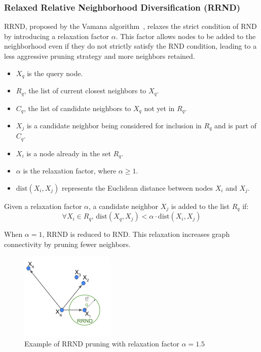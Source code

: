 \subsubsection{Relaxed Relative Neighborhood Diversification (RRND)}
RRND, proposed by the Vamana algorithm~\cite{vamana}, relaxes the strict condition of RND by introducing a relaxation factor \(\alpha\). This factor allows nodes to be added to the neighborhood even if they do not strictly satisfy the RND condition, leading to a less aggressive pruning strategy and more neighbors retained.

\begin{itemize}
    \item \(X_q\) is the query node.
    \item \(R_q\), the list of current closest neighbors to \(X_q\).
    \item \(C_q\), the list of candidate neighbors to \(X_q\) not yet in \(R_q\).
    \item \(X_j\) is a candidate neighbor being considered for inclusion in \(R_q\) and is part of \(C_q\).
    \item \(X_i\) is a node already in the set \(R_q\).
    \item \(\alpha\) is the relaxation factor, where \(\alpha \geq 1\).
    \item \(\text{dist}(X_i, X_j)\) represents the Euclidean distance between nodes \(X_i\) and \(X_j\).
\end{itemize}

\begin{definition}
\label{def:rrnd}
Given a relaxation factor \(\alpha\), a candidate neighbor \(X_j\) is added to the list \(R_q\) if:
\begin{equation}
    \forall X_i \in R_q, \, \text{dist}(X_q, X_j) < \alpha \cdot \text{dist}(X_i, X_j)
\end{equation}
\end{definition}

When \(\alpha = 1\), RRND is reduced to RND. This relaxation increases graph connectivity by pruning fewer neighbors.

\begin{figure}[h]
    \centering
    \includegraphics[width=0.4\textwidth]{../img/related/rrnd.png}
    \caption{Example of RRND pruning with relaxation factor \(\alpha = 1.5\)}
    \label{fig:ND:RRND}
\end{figure}


